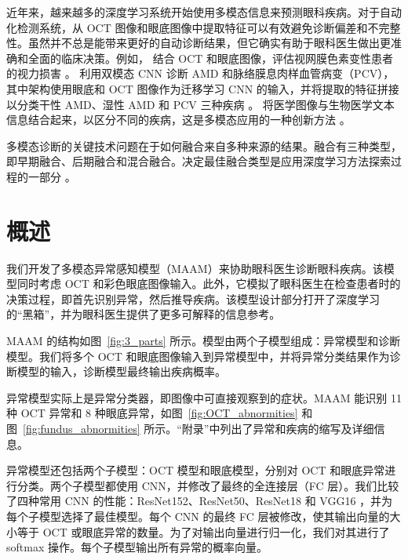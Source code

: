 \documentclass{article}
\begin{document}
\begin{multicols}{2}
	近年来，越来越多的深度学习系统开始使用多模态信息来预测眼科疾病。对于自动化检测系统，从 OCT 图像和眼底图像中提取特征可以有效避免诊断偏差和不完整性。虽然并不总是能带来更好的自动诊断结果，但它确实有助于眼科医生做出更准确和全面的临床决策。例如，\citeauthor{liu2023prediction} 结合 OCT 和眼底图像，评估视网膜色素变性患者的视力损害 \autocite{liu2023prediction}。\citeauthor{Xu2021} 利用双模态 CNN 诊断 AMD 和脉络膜息肉样血管病变（PCV），其中架构使用眼底和 OCT 图像作为迁移学习 CNN 的输入，并将提取的特征拼接以分类干性 AMD、湿性 AMD 和 PCV 三种疾病 \autocite{Xu2021}。\citeauthor{Andrearczyk2018} 将医学图像与生物医学文本信息结合起来，以区分不同的疾病，这是多模态应用的一种创新方法 \autocite{Andrearczyk2018}。
	
	多模态诊断的关键技术问题在于如何融合来自多种来源的结果。融合有三种类型，即早期融合、后期融合和混合融合。决定最佳融合类型是应用深度学习方法探索过程的一部分 \autocite{Ichhpujani_Thakur_2021}。
	
	\section{概述}
	\label{sec:overview}
	
	我们开发了多模态异常感知模型（MAAM）来协助眼科医生诊断眼科疾病。该模型同时考虑 OCT 和彩色眼底图像输入。此外，它模拟了眼科医生在检查患者时的决策过程，即首先识别异常，然后推导疾病。该模型设计部分打开了深度学习的“黑箱”，并为眼科医生提供了更多可解释的信息参考。
	
	MAAM 的结构如图~\ref{fig:3_parts} 所示。模型由两个子模型组成：异常模型和诊断模型。我们将多个 OCT 和眼底图像输入到异常模型中，并将异常分类结果作为诊断模型的输入，诊断模型最终输出疾病概率。
	
	\vspace{0.5cm}
	
	异常模型实际上是异常分类器，即图像中可直接观察到的症状。MAAM 能识别 11 种 OCT 异常和 8 种眼底异常，如图~\ref{fig:OCT_abnormities} 和图~\ref{fig:fundus_abnormities} 所示。“附录”中列出了异常和疾病的缩写及详细信息。
	
	异常模型还包括两个子模型：OCT 模型和眼底模型，分别对 OCT 和眼底异常进行分类。两个子模型都使用 CNN，并修改了最终的全连接层（FC 层）。我们比较了四种常用 CNN 的性能：ResNet152、ResNet50、ResNet18 \autocite{He_Zhang_Ren_Sun_2016}和 VGG16 \autocite{Simonyan_Zisserman_2015}，并为每个子模型选择了最佳模型。每个 CNN 的最终 FC 层被修改，使其输出向量的大小等于 OCT 或眼底异常的数量。为了对输出向量进行归一化，我们对其进行了 softmax 操作。每个子模型输出所有异常的概率向量。
	

\end{multicols}
\end{document}
